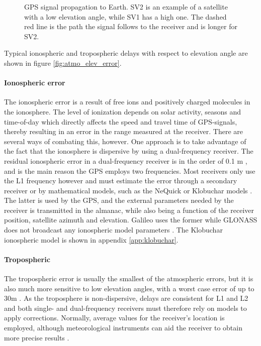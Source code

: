 \begin{figure}[!htbp]
	\centering
	
    \caption[GPS signal propagation to Earth]{GPS signal propagation to Earth. SV2 is an example of a satellite with a low elevation angle, while SV1 has a high one. The dashed red line is the path the signal follows to the receiver and is longer for SV2.}
    \label{fig:signal_prop}
\end{figure}

Typical ionospheric and tropospheric delays with respect to elevation angle are shown in figure \ref{fig:atmo_elev_error}. 

\paragraph{Ionospheric error}
The ionospheric error is a result of free ions and positively charged molecules in the ionosphere. The level of ionization depends on solar activity, seasons and time-of-day which directly affects the speed and travel time of GPS-signals, thereby resulting in an error in the range measured at the receiver. There are several ways of combating this, however. One approach is to take advantage of the fact that the ionosphere is dispersive by using a dual-frequency receiver. The residual ionospheric error in a dual-frequency receiver is in the order of 0.1 m \cite{groves2013principles}, and is the main reason the GPS employs two frequencies. Most receivers only use the L1 frequency however and must estimate the error through a secondary receiver or by mathematical models, such as the NeQuick \cite{di1990analytical} or Klobuchar models \cite{klobuchar1987ionospheric}. The latter is used by the GPS, and the external parameters needed by the receiver is transmitted in the almanac, while also being a function of the receiver position, satellite azimuth and elevation. Galileo uses the former while GLONASS does not broadcast any ionospheric model parameters \cite{groves2013principles}. The Klobuchar ionospheric model is shown in appendix \ref{app:klobuchar}.\\

\paragraph{Tropospheric}
The tropospheric error is usually the smallest of the atmospheric errors, but it is also much more sensitive to low elevation angles, with a worst case error of up to 30m \cite{farrell2008aided}. As the troposphere is non-dispersive, delays are consistent for L1 and L2 and both single- and dual-frequency receivers must therefore rely on models to apply corrections. Normally, average values for the receiver's location is employed, although meteorological instruments can aid the receiver to obtain more precise results \cite{farrell2008aided}. \\

